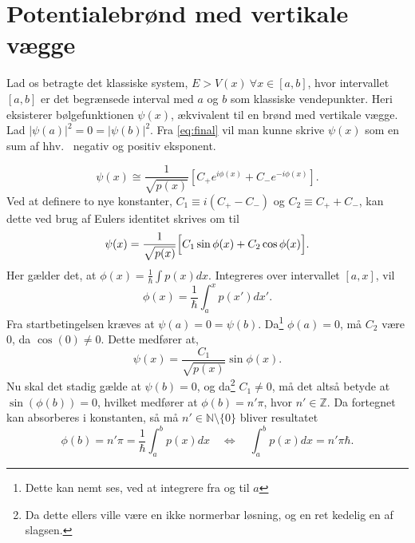 \section{Potentialebrønd med vertikale vægge}
Lad os betragte det klassiske system, $E > V(x) \ \forall x \in[a,b]$, hvor intervallet $[a,b]$ er det begrænsede interval med $a$ og $b$ som klassiske vendepunkter. Heri eksisterer bølgefunktionen $\psi(x)$, ækvivalent til en brønd med vertikale vægge. Lad $|\psi(a)|^{2} = 0 = |\psi(b)|^{2}$. Fra \cref{eq:final} vil man kunne skrive $\psi(x)$ som en sum af hhv. \ negativ og positiv eksponent.

\begin{equation}
    \psi(x) \cong \frac{1}{\sqrt{p(x)}}\left[C_{+}e^{i\phi(x)}+C_{-}e^{-i\phi(x)}\right].
  \label{eq:kvantiseringStart}
\end{equation}
Ved at definere to nye konstanter, $C_1 \equiv i(C_{+}-C_{-})$ og $C_2 \equiv C_{+}+C_{-}$, kan dette ved brug af Eulers identitet skrives om til
\begin{equation}
  \psi(x) = \frac{1}{\sqrt{p(x)}}
  \Bigl[    C_1\sin{\phi(x)} + C_2\cos{\phi(x)}   \Bigr].
  \label{eq:kvantiseringSinCos}
\end{equation}
Her gælder det, at $\phi(x) = \frac{1}{\hbar}\int p(x) dx$. Integreres over intervallet $[a, x]$, vil
\begin{equation}
  \phi(x) = \frac{1}{\hbar}\int_{a}^{x} p(x')dx'.
\end{equation}
Fra startbetingelsen kræves at $\psi(a) = 0 = \psi(b)$. Da\footnote{Dette kan nemt ses, ved at integrere fra og til $a$} $\phi(a) = 0$, må $C_2$ være 0, da $\cos(0)\neq 0$. Dette medfører at,
\begin{equation}
    \psi(x) = \frac{C_1}{\sqrt{p(x)}}\sin{\phi(x)}.
\end{equation}
Nu skal det stadig gælde at $\psi(b) = 0$, og da\footnote{Da dette ellers ville være en ikke normerbar løsning, og en ret kedelig en af slagsen.} $C_1\neq 0$, må det altså betyde at $\sin(\phi(b)) = 0$, hvilket medfører at $\phi(b) = n'\pi$, hvor $n' \in \mathbb{Z}$. Da fortegnet kan absorberes i konstanten, så må $n' \in \mathbb{N} \setminus \{0\}$ bliver resultatet
\begin{equation}
    \phi(b) = n'\pi = \frac{1}{\hbar}\int_{a}^{b} p(x) dx \quad \Leftrightarrow \quad \int_{a}^{b} p(x) dx = n'\pi\hbar.
  \label{eq:kvantiDone}
\end{equation}
